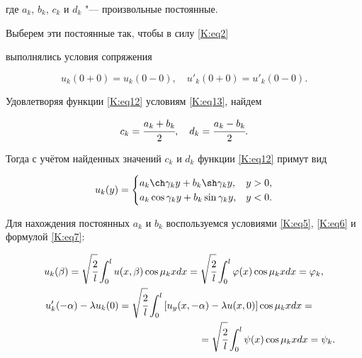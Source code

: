 где $a_k$, $b_k$, $c_k$ и $d_k$ "--- произвольные постоянные. 

Выберем эти постоянные так, чтобы в силу \eqref{K:eq2}

выполнялись условия сопряжения

\begin{equation}

\label{K:eq13}

u_k(0+0) =u_k (0-0), \quad u'_k(0+0)=u'_k(0-0).

\end{equation}

Удовлетворяя функции \eqref{K:eq12} условиям \eqref{K:eq13}, найдем

$$

c_k=\cfrac{a_k+b_k}2, \quad d_k=\cfrac{a_k-b_k}2.

$$

Тогда с учётом найденных значений $c_k$ и $d_k$ функции \eqref{K:eq12} примут вид

\begin{equation}

\label{K:eq14}

u_k(y)=\begin{cases}

a_k \ch \gamma_k y +b_k \sh \gamma_k y, & y>0,\\

a_k \cos \gamma_k y +b_k \sin  \gamma_k y, & y<0.

\end{cases}

\end{equation}

Для нахождения постоянных $a_k$ и $b_k$ воспользуемся условиями \eqref{K:eq5}, \eqref{K:eq6} и формулой \eqref{K:eq7}:

\begin{gather}

\label{K:eq16}

u_k(\beta)=\sqrt{\cfrac 2 l} \int _0^l u(x,\beta) \cos \mu_k x dx=\sqrt{\cfrac 2 l} \int _0^l \varphi(x) \cos \mu_k x dx =\varphi_k, \\

u'_k(-\alpha) -\lambda u_k(0) = \sqrt{\cfrac 2 l} \int _0^l \left[u_y (x,-\alpha) - \lambda u(x, 0) \right] \cos \mu_k x dx = 

\quad 

\notag\\

\label{K:eq16}

\hspace{6cm}

=\sqrt{\cfrac 2 l } \int _0^l \psi(x) \cos \mu_k x dx = \psi_k.

\end{gather}

